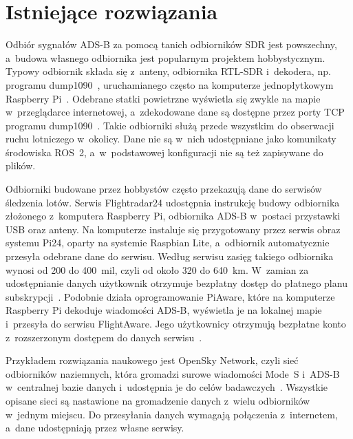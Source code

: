 \section{Istniejące rozwiązania}
\label{sec:istniejace}


Odbiór sygnałów ADS-B za pomocą tanich odbiorników SDR jest powszechny, a~budowa własnego odbiornika jest popularnym projektem hobbystycznym. Typowy odbiornik składa się z~anteny, odbiornika RTL-SDR i~dekodera, np. programu dump1090~\cite{sun2021}, uruchamianego często na komputerze jednopłytkowym Raspberry Pi~\cite{fr24build,piaware}. Odebrane statki powietrzne wyświetla się zwykle na mapie w~przeglądarce internetowej, a~zdekodowane dane są dostępne przez porty TCP programu dump1090~\cite{dump1090}. Takie odbiorniki służą przede wszystkim do obserwacji ruchu lotniczego w~okolicy. Dane nie są w~nich udostępniane jako komunikaty środowiska ROS~2, a~w~podstawowej konfiguracji nie są też zapisywane do plików.

Odbiorniki budowane przez hobbystów często przekazują dane do serwisów śledzenia lotów. Serwis Flightradar24 udostępnia instrukcję budowy odbiornika złożonego z~komputera Raspberry Pi, odbiornika ADS-B w~postaci przystawki USB oraz anteny. Na komputerze instaluje się przygotowany przez serwis obraz systemu Pi24, oparty na systemie Raspbian Lite, a~odbiornik automatycznie przesyła odebrane dane do serwisu. Według serwisu zasięg takiego odbiornika wynosi od 200 do 400~mil, czyli od około 320 do \SI{640}{km}. W~zamian za udostępnianie danych użytkownik otrzymuje bezpłatny dostęp do płatnego planu subskrypcji~\cite{fr24build}. Podobnie działa oprogramowanie PiAware, które na komputerze Raspberry Pi dekoduje wiadomości ADS-B, wyświetla je na lokalnej mapie i~przesyła do serwisu FlightAware. Jego użytkownicy otrzymują bezpłatne konto z~rozszerzonym dostępem do danych serwisu~\cite{piaware}.

Przykładem rozwiązania naukowego jest OpenSky Network, czyli sieć odbiorników naziemnych, która gromadzi surowe wiadomości Mode~S i~ADS-B w~centralnej bazie danych i~udostępnia je do celów badawczych~\cite{schafer2014}. Wszystkie opisane sieci są nastawione na gromadzenie danych z~wielu odbiorników w~jednym miejscu. Do przesyłania danych wymagają połączenia z~internetem, a~dane udostępniają przez własne serwisy.

